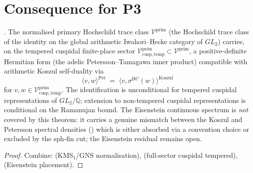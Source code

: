 \section{Consequence for P3}
\label{v4-arith:kms-gns:P3}

\begin{theorem}
\label{v4-arith:kms-gns:thm:P3-tempered-cuspidal}
\ClaimStatusProvedHere. The normalised primary Hochschild trace class
\(\mathcal{V}^{\mathrm{prim}}\) (the Hochschild trace class of the
identity on the global arithmetic Iwahori--Hecke category of
\(GL_{2}\)) carries, on the tempered cuspidal finite-place sector
\(\mathcal{V}^{\mathrm{prim}}_{\mathrm{cusp,temp}}\subset\mathcal{V}^{\mathrm{prim}}\),
a positive-definite Hermitian form (the adelic Petersson--Tamagawa
inner product) compatible with arithmetic Koszul self-duality via
\begin{equation*}
\langle v,w\rangle^{\mathrm{Pet}}\;=\;\langle v,\sigma^{\mathrm{BC}}(w)\rangle^{\mathrm{Koszul}}
\end{equation*}
for \(v,w\in\mathcal{V}^{\mathrm{prim}}_{\mathrm{cusp,temp}}\). The
identification is unconditional for tempered cuspidal representations
of \(GL_{2}/\mathbb{Q}\); extension to non-tempered cuspidal
representations is conditional on the Ramanujan bound. The
Eisenstein continuous spectrum is \emph{not} covered by this
theorem: it carries a genuine mismatch between the Koszul and
Petersson spectral densities
() which is either
absorbed via a convention choice or excluded by the sph-fin cut;
the Eisenstein residual remains open.
\end{theorem}

\begin{proof}
Combine:
 (KMS\({}_{1}\)/GNS normalisation),
(full-sector cuspidal tempered),
(Eisenstein placement).
\end{proof}


